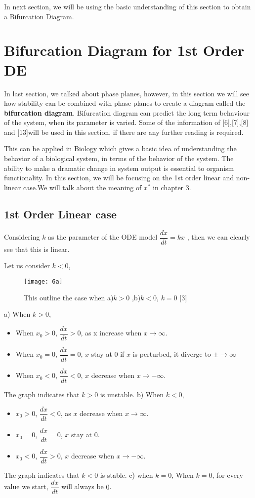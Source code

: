 \documentclass[a4paper]{report}
\theoremstyle{definition}
\begin{document}
In next section, we will be using the basic understanding of this section to obtain a Bifurcation Diagram.
\section{Bifurcation Diagram for 1st Order DE}

In last section, we talked about phase planes, however, in this section we will see how stability can be combined with phase planes to create a diagram called the \textbf{bifurcation diagram}. Bifurcation diagram can predict the long term behaviour of the system, when its parameter is varied.
Some of the information of [6],[7],[8] and [13]will be used in this section, if there are any further reading is required.

This can be applied in Biology which gives a basic idea of understanding the behavior of a biological system, in terms of the behavior of the system.  The ability to make a dramatic change in system output is essential to organism functionality. In this section, we will be focusing on the 1st order linear and non-linear case.We will talk about the meaning of $x^*$ in chapter 3.

\subsection{1st Order Linear case}
Considering $k$ as the parameter of the ODE model $\dfrac{dx}{dt}=k{x}$ , then we can clearly see that this is linear.

Let us consider $k<0$,

\begin{figure}[H]
\texttt{[image: 6a]}
\caption{This outline the case when a)$k>0$ ,b)$k<0$, $k=0$ [3]}
\label{fig:figure32}
\end{figure} 
a) When $k>0$, 
\begin{itemize}
\item{When $x_0>0$, $\dfrac{dx}{dt}>0$, as x increase when $x\rightarrow\infty$.}
\item{When $x_0=0$, $\dfrac{dx}{dt}=0$, $x$ stay at $0$ if $x$ is perturbed, it diverge to $\pm\rightarrow\infty$}
\item {When $x_0<0$, $\dfrac{dx}{dt}<0$, $x$ decrease when $x\rightarrow -\infty$.}
\end{itemize}
The graph indicates that $k>0$ is unstable.
b) When $k<0$, 
\begin{itemize}
\item {$x_0>0$, $\dfrac{dx}{dt}<0$, as $x$ decrease when $x\rightarrow\infty$.}
\item {$x_0=0$, $\dfrac{dx}{dt}=0$, $x$ stay at $0$.}
\item{$x_0<0$, $\dfrac{dx}{dt}>0$, $x$ decrease when $x\rightarrow -\infty$.}
\end{itemize}
The graph indicates that $k<0$ is stable.
\newline
c) when $k=0$, When $k=0$, for every value we start, $\dfrac{dx}{dt}$ will always be $0$.
\end{document}

